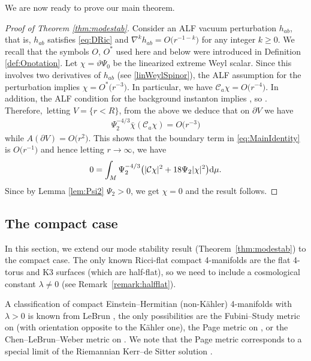 \documentclass[pdftex]{sigma}
\numberwithin{equation}{section}
\begin{document}
We are now ready to prove our main theorem.

\begin{proof}[Proof of Theorem \ref{thm:modestab}]
Consider an ALF vacuum perturbation $h_{ab}$, that is, $h_{ab}$ satisfies \eqref{eq:DRic} and $\nabla^k h_{ab} = O\bigl(r^{-1-k}\bigr)$ for any integer $k \geq 0$. We recall that the symbols $O$, $O^{*}$ used here and below were introduced in Definition \ref{def:Onotation}.
Let $\chi = \vartheta \Psi_0$ be the linearized extreme Weyl scalar. Since this involves two derivatives of $h_{ab}$ (see \eqref{linWeylSpinor}), the ALF assumption for the perturbation implies $\chi = O^*\bigl(r^{-3}\bigr)$.
In particular, we have $\mathcal{C}_a \chi = O\bigl(r^{-4}\bigr)$. In addition, the ALF condition for the background instanton implies , so . Therefore,~letting ${V = \{r < R\}}$, from the above we deduce that on $\partial V$ we have
\begin{align*}
\Psi_{2}^{-4/3}\bar\chi(\mathcal{C}_{a}\chi) =O\bigl(r^{-3}\bigr)
\end{align*}
while $A(\partial V) = O\bigl(r^2\bigr)$. This shows that the boundary term in \eqref{eq:MainIdentity} is $O\bigl(r^{-1}\bigr)$ and hence letting $r \to \infty$, we have
\begin{align*}
0 = \int_{M}\Psi_{2}^{-4/3}\bigl(|\mathcal{C}\chi|^{2} + 18\Psi_{2}|\chi|^2\bigr){\rm d}\mu.
\end{align*}
Since by Lemma \ref{lem:Psi2} $\Psi_2 > 0$, we get $\chi=0$ and the result follows.
\end{proof}

\subsection{The compact case}
In this section, we extend our mode stability result (Theorem~\ref{thm:modestab})
to the compact case. The only known Ricci-flat compact 4-manifolds are the flat 4-torus and K3 surfaces (which are half-flat), so we need to include a cosmological constant $\lambda\neq0$ (see Remark~\ref{remark:halfflat}).

A classification of compact Einstein--Hermitian (non-K\"ahler) 4-manifolds with $\lambda>0$ is known from LeBrun \cite{MR2899877}, the only possibilities are the Fubini--Study metric on  (with orientation opposite to the K\"ahler one), the Page metric on , or the Chen--LeBrun--Weber metric on . We note that the Page metric corresponds to a special limit of the Riemannian Kerr--de Sitter solution \cite{Page}.
\end{document}
